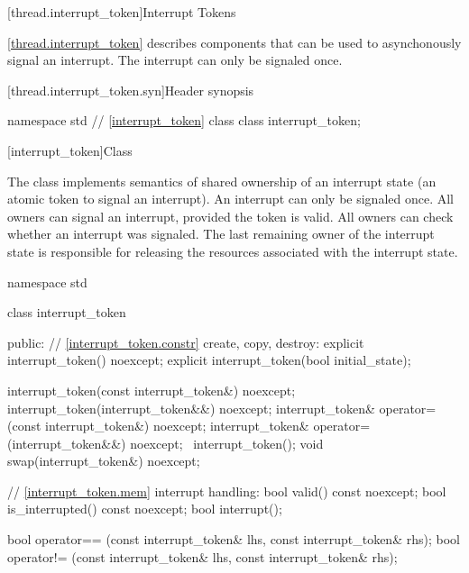 {\color{insertcolor}

[thread.interrupt_token]{Interrupt Tokens}

\pnum
\ref{thread.interrupt_token} describes components that can be used to
asynchonously signal an interrupt.
The interrupt can only be signaled once.

[thread.interrupt_token.syn]{Header  synopsis}
%

\begin{codeblock}
namespace std {
  // \ref{interrupt_token} class 
  class interrupt_token;
}
\end{codeblock}


%
[interrupt_token]{Class }

\pnum
{}%
The class  implements semantics of shared ownership of an
interrupt state (an atomic token to signal an interrupt).
An interrupt can only be signaled once.
All owners can signal an interrupt, provided the token is valid.
All owners can check whether an interrupt was signaled.
The last remaining owner of the interrupt state is responsible for 
releasing the resources associated with the interrupt state.

\begin{codeblock}
namespace std {
  class interrupt_token {
  public:
    // \ref{interrupt_token.constr} create, copy, destroy:
    explicit interrupt_token() noexcept;
    explicit interrupt_token(bool initial_state);

    interrupt_token(const interrupt_token&) noexcept;
    interrupt_token(interrupt_token&&) noexcept;
    interrupt_token& operator=(const interrupt_token&) noexcept;
    interrupt_token& operator=(interrupt_token&&) noexcept;
    ~interrupt_token();
    void swap(interrupt_token&) noexcept;

    // \ref{interrupt_token.mem} interrupt handling:
    bool valid() const noexcept;
    bool is_interrupted() const noexcept;
    bool interrupt();
  }
}

bool operator== (const interrupt_token& lhs, const interrupt_token& rhs);
bool operator!= (const interrupt_token& lhs, const interrupt_token& rhs);
\end{codeblock}

}
